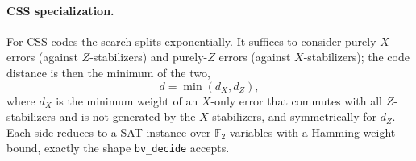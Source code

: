 \paragraph{CSS specialization.} For CSS codes the search splits exponentially.
It suffices to consider purely-$X$ errors (against $Z$-stabilizers) and
purely-$Z$ errors (against $X$-stabilizers); the code distance is then the
minimum of the two,
$$d = \min(d_X, d_Z),$$
where $d_X$ is the minimum weight of an $X$-only error that commutes with all
$Z$-stabilizers and is not generated by the $X$-stabilizers, and symmetrically
for $d_Z$. Each side reduces to a SAT instance over $\mathbb{F}_2$ variables
with a Hamming-weight bound, exactly the shape \lstinline{bv_decide} accepts.

%

